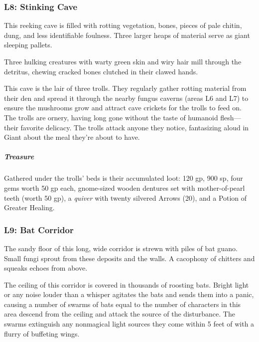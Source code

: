 \documentclass[10pt,a4paper,twoside,bg=print,twocolumn,openany,nodeprecatedcode]{dndbook}
\begin{document}
\subsubsection{L8: Stinking Cave}
\begin{DndReadAloud}{}
This reeking cave is filled with rotting vegetation, bones, pieces of pale chitin, dung, and less identifiable foulness. Three larger heaps of material serve as giant sleeping pallets.

Three hulking creatures with warty green skin and wiry hair mill through the detritus, chewing cracked bones clutched in their clawed hands.

\end{DndReadAloud}

This cave is the lair of three trolls. They regularly gather rotting material from their den and spread it through the nearby fungus caverns (areas L6 and L7) to ensure the mushrooms grow and attract cave crickets for the trolls to feed on. The trolls are ornery, having long gone without the taste of humanoid flesh—their favorite delicacy. The trolls attack anyone they notice, fantasizing aloud in Giant about the meal they're about to have.

\subparagraph{Treasure}
Gathered under the trolls' beds is their accumulated loot: 120 gp, 900 sp, four gems worth 50 gp each, gnome-sized wooden dentures set with mother-of-pearl teeth (worth 50 gp), a \textit{quiver} with twenty silvered Arrows (20), and a Potion of Greater Healing.

\subsubsection{L9: Bat Corridor}
\begin{DndReadAloud}{}
The sandy floor of this long, wide corridor is strewn with piles of bat guano. Small fungi sprout from these deposits and the walls. A cacophony of chitters and squeaks echoes from above.

\end{DndReadAloud}

The ceiling of this corridor is covered in thousands of roosting bats. Bright light or any noise louder than a whisper agitates the bats and sends them into a panic, causing a number of swarms of bats equal to the number of characters in this area descend from the ceiling and attack the source of the disturbance. The swarms extinguish any nonmagical light sources they come within 5 feet of with a flurry of buffeting wings.
\end{document}

